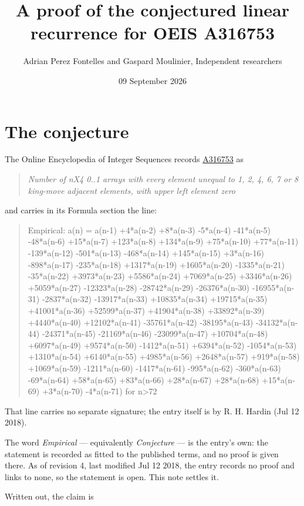 \documentclass[11pt]{article}
\title{A proof of the conjectured linear recurrence for OEIS A316753}
\author{Adrian Perez Fontelles and Gaspard Moulinier, Independent researchers}
\date{09 September 2026}
\theoremstyle{definition}
\begin{document}
\maketitle
\section{The conjecture}

The Online Encyclopedia of Integer Sequences records \href{https://oeis.org/A316753}{A316753} as

\begin{quote}\itshape Number of nX4 0..1 arrays with every element unequal to 1, 2, 4, 6, 7 or 8 king-move adjacent elements, with upper left element zero\end{quote}

and carries in its Formula section the line:

\begin{quote}\ttfamily Empirical: a(n) = a(n-1) +4*a(n-2) +8*a(n-3) -5*a(n-4) -41*a(n-5) -48*a(n-6) +15*a(n-7) +123*a(n-8) +134*a(n-9) +75*a(n-10) +77*a(n-11) -139*a(n-12) -501*a(n-13) -468*a(n-14) +145*a(n-15) +3*a(n-16) -898*a(n-17) -235*a(n-18) +1317*a(n-19) +1605*a(n-20) -1335*a(n-21) -35*a(n-22) +3973*a(n-23) +5586*a(n-24) +7069*a(n-25) +3346*a(n-26) +5059*a(n-27) -12323*a(n-28) -28742*a(n-29) -26376*a(n-30) -16955*a(n-31) -2837*a(n-32) -13917*a(n-33) +10835*a(n-34) +19715*a(n-35) +41001*a(n-36) +52599*a(n-37) +41904*a(n-38) +33892*a(n-39) +4440*a(n-40) +12102*a(n-41) -35761*a(n-42) -38195*a(n-43) -34132*a(n-44) -24371*a(n-45) -21169*a(n-46) -23099*a(n-47) +10704*a(n-48) +6097*a(n-49) +9574*a(n-50) -1412*a(n-51) +6394*a(n-52) -1054*a(n-53) +1310*a(n-54) +6140*a(n-55) +4985*a(n-56) +2648*a(n-57) +919*a(n-58) +1069*a(n-59) -1211*a(n-60) -1417*a(n-61) -995*a(n-62) -360*a(n-63) -69*a(n-64) +58*a(n-65) +83*a(n-66) +28*a(n-67) +28*a(n-68) +15*a(n-69) +3*a(n-70) -4*a(n-71) for n>72\end{quote}

That line carries no separate signature; the entry itself is by R. H. Hardin (Jul 12 2018).

The word {\itshape Empirical} --- equivalently {\itshape Conjecture} --- is the entry's own: the statement is recorded as fitted to the published terms, and no proof is given there. As of revision 4, last modified Jul 12 2018, the entry records no proof and links to none, so the statement is open. This note settles it.

Written out, the claim is
\end{document}
